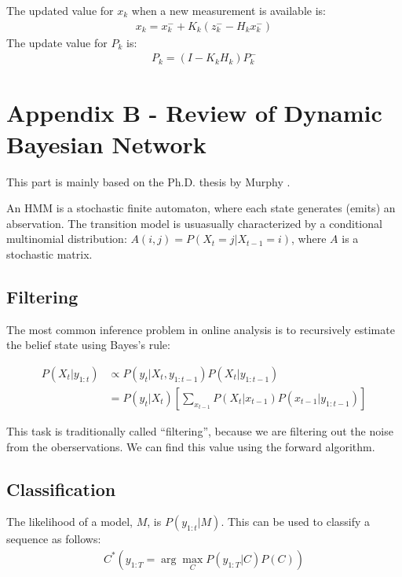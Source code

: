 The updated value for $x_k$ when a new measurement is available is:
\begin{align*}
x_k = x_k^- + K_k(z_k^- - H_kx_k^-)
\end{align*}
The update value for $P_k$ is:
\begin{align*}
P_k = (I - K_kH_k)P_k^-
\end{align*}

\section{Appendix B - Review of Dynamic Bayesian Network}
This part is mainly based on the Ph.D. thesis by Murphy \cite{murphy02}.

An HMM is a stochastic finite automaton, where each state generates (emits) an
abservation. The transition model is usuasually characterized by a conditional
multinomial distribution: $A(i, j) = P(X_t = j | X_{t-1} = i)$, where $A$ is a
stochastic matrix.

\subsection{Filtering}
The most common inference problem in online analysis is to recursively estimate
the belief state using Bayes's rule:

\begin{align*}
P(X_t | y_{1:t}) & \propto P(y_t | X_t, y_{1:t-1})P(X_t | y_{1:t-1}) \\
 				 & = P(y_t | X_t) \left[\sum_{x_{t - 1}} 
				 	 P(X_t | x_{t - 1})P(x_{t - 1} | y_{1:t - 1})\right]	
\end{align*}

This task is traditionally called ``filtering'', because we are filtering out
the noise from the oberservations. We can find this value using the forward
algorithm.

\subsection{Classification}
The likelihood of a model, $M$, is $P(y_{1:t}|M)$. This can be used to classify
a sequence as follows:
\begin{align*}
C^*(y_{1:T} = \arg \max_{C} P(y_{1:T} | C)P(C))
\end{align*}

